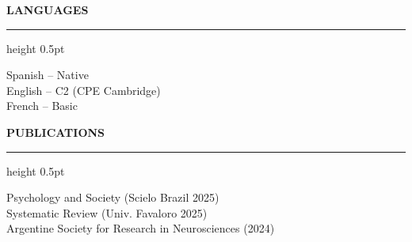 \documentclass[11pt,a4paper]{article}
\newcommand{\cvtitle}[1]{ %
  {\color{primary}\bfseries\large\uppercase{ #1 }}
  {\color{accent}\hrule height 0.5pt}\vspace{6pt}
}
\begin{document}
\vspace{8pt}

\begin{minipage}[t]{0.48\textwidth}
\cvtitle{ Languages }
{\normalsize

Spanish -- Native \\

English -- C2 (CPE Cambridge) \\

French -- Basic \\

}
\end{minipage}
\hfill
\begin{minipage}[t]{0.48\textwidth}
\cvtitle{ Publications }
{\small

Psychology and Society (Scielo Brazil 2025) \\

Systematic Review (Univ. Favaloro 2025) \\

Argentine Society for Research in Neurosciences (2024) \\

}
\end{minipage}
\end{document}

